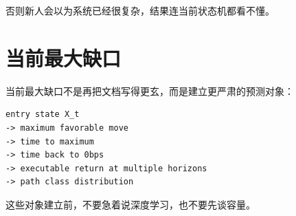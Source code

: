 否则新人会以为系统已经很复杂，结果连当前状态机都看不懂。

\section{当前最大缺口}

当前最大缺口不是再把文档写得更玄，而是建立更严肃的预测对象：

\begin{lstlisting}
entry state X_t
-> maximum favorable move
-> time to maximum
-> time back to 0bps
-> executable return at multiple horizons
-> path class distribution
\end{lstlisting}

这些对象建立前，不要急着说深度学习，也不要先谈容量。

